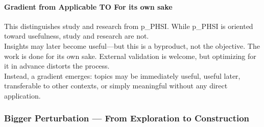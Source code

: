 \paragraph{Gradient from Applicable TO For its own sake}

This distinguishes study and research from \gls{p_PHSI}. While \gls{p_PHSI} is oriented toward usefulness, study and research are not.\\

Insights may later become useful—but this is a byproduct, not the objective. The work is done for its own sake. External validation is welcome, but optimizing for it in advance distorts the process.\\

Instead, a gradient emerges: topics may be immediately useful, useful later, transferable to other contexts, or simply meaningful without any direct application.

\subsubsection{Bigger Perturbation — From Exploration to Construction}

